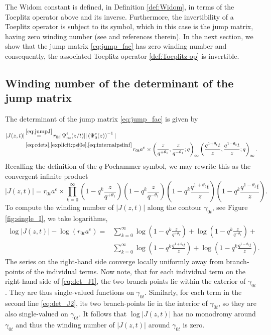 \documentclass[a4paper,reqno,11pt]{amsart}
\numberwithin{equation}{section}
\numberwithin{figure}{section}
\theoremstyle{plain}
\theoremstyle{remark}
\numberwithin{rhp}{section}
\begin{document}
The Widom constant is defined, in Definition \ref{def:Widom}, in terms of the Toeplitz operator above and its inverse. Furthermore, the invertibility of a Toeplitz operator is subject to its symbol, which in this case is the jump matrix, having zero winding number (see \cite{basor2022harold} and references therein). In the next section, we show that the jump matrix \eqref{eq:jump_fac} has zero winding number and consequently, the associated Toeplitz operator \eqref{def:Toeplitz-op} is invertible.


\subsection{Winding number of the determinant of the jump matrix}
The determinant of the jump matrix \eqref{eq:jump_fac} is given by
\begin{align}
   |J(z,t)|& \mathop{=}^{\eqref{eq:jumpJ}}  r_{0t}\vert\Psi_{\infty}^{i}(z/t)\vert \vert \left(\Psi_{0}^{e}(z)\right)^{-1} \vert\\
   &\mathop{=}^{\eqref{eq:cdets},\eqref{explicit:psi0e}, \eqref{eq:internalpsiinf}}r_{0t}a^e\times\left(\frac{z}{q^{+\theta_1}},\frac{z}{q^{-\theta_1}};q\right)_\infty
   \left(\frac{q^{1+\theta_t}t}{z},\frac{q^{1-\theta_t}t}{z};q\right)_\infty.
\end{align}
Recalling the definition of the $q$-Pochammer symbol, we may rewrite this as the convergent infinite product
\begin{equation*}
   |J(z,t)|=r_{0t}a^e\times\prod_{k=0}^\infty 
   \left(1-q^k \frac{z}{q^{+\theta_1}}\right)
   \left(1-q^k \frac{z}{q^{-\theta_1}}\right)
   \left(1-q^k \frac{q^{1+\theta_t}t}{z}\right)
   \left(1-q^k \frac{q^{1-\theta_t}t}{z}\right).
\end{equation*}
To compute the winding number of $|J(z,t)|$ along the contour $\gamma_{0t}$, see Figure \ref{fig:single_I}, we take logarithms,
\begin{align}
   \log|J(z,t)|-\log(r_{0t}a^e)=&\sum_{k=0}^\infty 
   \log\left(1-q^k \frac{z}{q^{+\theta_1}}\right)+   
   \log\left(1-q^k \frac{z}{q^{-\theta_1}}\right)+\label{eq:det_J1}\\
   &\sum_{k=0}^\infty
   \log\left(1-q^k \frac{q^{1+\theta_t}t}{z}\right)+
   \log\left(1-q^k \frac{q^{1-\theta_t}t}{z}\right).\label{eq:det_J2}
\end{align}
The series on the right-hand side converge locally uniformly away from branch-points of the individual terms. Now note, that for each individual term on the right-hand side of \eqref{eq:det_J1}, the two branch-points lie within the exterior of $\gamma_{0t}$. They are thus single-valued functions on $\gamma_{0t}$. Similarly, for each term in the second line \eqref{eq:det_J2}, its two branch-points lie in the interior of $\gamma_{0t}$, so they are also single-valued on $\gamma_{0t}$. It follows that $\log|J(z,t)|$ has no monodromy around $\gamma_{0t}$ and thus the winding number of $|J(z,t)|$ around $\gamma_{0t}$ is zero.
\end{document}
